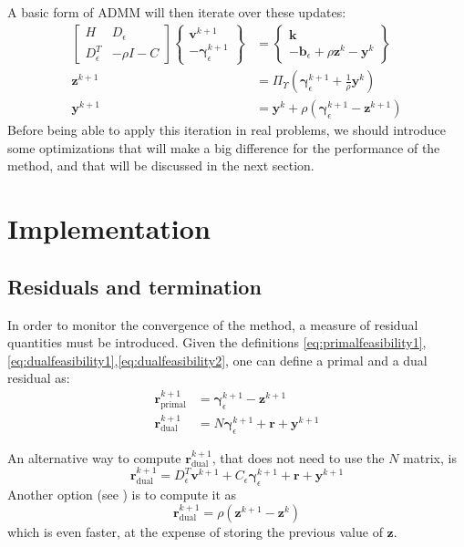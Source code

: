 \documentclass[AMA,STIX1COL]{WileyNJD-v2}
\newcommand{\vect}[1]{\bm{#1}}
\begin{document}
A basic form of ADMM will then iterate over these updates:
\begin{align}
    \begin{bmatrix}
		 H   & D_\epsilon \\
		 D_\epsilon^T & - \rho I - C
		\end{bmatrix}
		\begin{Bmatrix}
		 \vect{v}^{k+1}   \\
		 -\vect{\gamma}_\epsilon^{k+1} 
		\end{Bmatrix}
		&=
		\begin{Bmatrix}
		 \vect{k} \\
		 -\vect{b}_\epsilon + \rho \vect{z}^k -\vect{y}^k 
		\end{Bmatrix} \label{eq:admm_step1} \\
		\vect{z}^{k+1} &= \Pi_\Upsilon \left(  \vect{\gamma}_\epsilon^{k+1} +\frac{1}{\rho} \vect{y}^k \right ) \label{eq:admm_step2} \\
		\vect{y}^{k+1} &= \vect{y}^k + \rho \left( \vect{\gamma}_\epsilon^{k+1} - \vect{z}^{k+1} \right) \label{eq:admm_step3}
\end{align}
%
Before being able to apply this iteration in real problems, we should introduce some optimizations that will make a big difference for the performance of the method, and that will be discussed in the next section.


\section{Implementation}


\subsection{Residuals and termination}

In order to monitor the convergence of the method, a measure of residual quantities must be introduced. 
Given the definitions \eqref{eq:primalfeasibility1},\eqref{eq:dualfeasibility1},\eqref{eq:dualfeasibility2}, one can define a primal and a dual residual as:
%
\begin{align}
 \vect{r}_{\text{primal}}^{k+1} &= \vect{\gamma}_\epsilon^{k+1}-\vect{z}^{k+1}   \\
 \vect{r}_{\text{dual}}^{k+1} &= N \vect{\gamma}_\epsilon^{k+1}+\vect{r}+\vect{y}^{k+1} 
\end{align}

An alternative way to compute $\vect{r}_{\text{dual}}^{k+1}$, that does not need to use the $N$ matrix, is 
\[
   \vect{r}_{\text{dual}}^{k+1} = D_\epsilon^T \vect{v}^{k+1} +C_\epsilon \vect{\gamma}_\epsilon^{k+1} + \vect{r} + \vect{y}^{k+1}
\]
Another option (see \cite{Boyd2011}) is to compute it as
\[
   \vect{r}_{\text{dual}}^{k+1} = \rho (\vect{z}^{k+1} - \vect{z}^{k})
\]
which is even faster, at the expense of storing the previous value of $\vect{z}$. 
\end{document}
